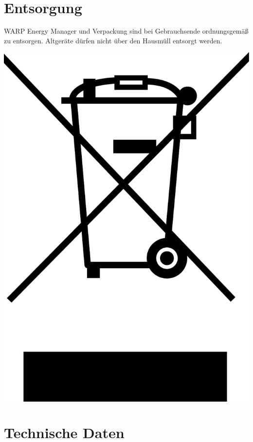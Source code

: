 \documentclass[a4paper,10pt]{article}
\begin{document}
\begin{multicols*}{2}
	\section{Entsorgung}
	\begin{minipage}{0.43\textwidth}
		WARP Energy Manager und Verpackung sind bei Gebrauchsende ordnungsgemäß zu
		entsorgen. Altgeräte dürfen nicht über den Hausmüll entsorgt werden.
	\end{minipage}\hfill
	\begin{minipage}{0.045\textwidth}
		\includegraphics[width=\linewidth]{./img/resized/weee.pdf}
	\end{minipage}

	\section{Technische Daten}


\end{multicols*}
\end{document}

